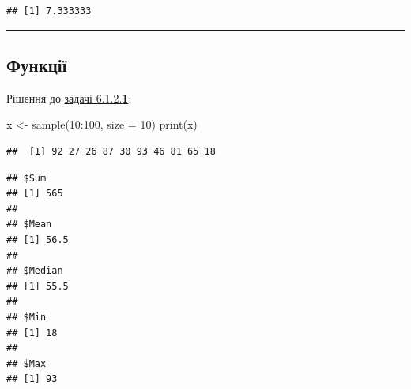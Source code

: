 \documentclass[
]{book}
\newenvironment{Shaded}{\begin{snugshade}}{\end{snugshade}}
\newcommand{\AttributeTok}[1]{\textcolor[rgb]{0.77,0.63,0.00}{#1}}
\newcommand{\ControlFlowTok}[1]{\textcolor[rgb]{0.13,0.29,0.53}{\textbf{#1}}}
\newcommand{\DecValTok}[1]{\textcolor[rgb]{0.00,0.00,0.81}{#1}}
\newcommand{\FunctionTok}[1]{\textcolor[rgb]{0.00,0.00,0.00}{#1}}
\newcommand{\NormalTok}[1]{#1}
\newcommand{\OtherTok}[1]{\textcolor[rgb]{0.56,0.35,0.01}{#1}}
\newcommand{\SpecialCharTok}[1]{\textcolor[rgb]{0.00,0.00,0.00}{#1}}
\begin{document}
\begin{verbatim}
## [1] 7.333333
\end{verbatim}

\begin{center}\rule{0.5\linewidth}{0.5pt}\end{center}

\hypertarget{chapter622}{%
\subsection{Функції}\label{chapter622}}

Рішення до \protect\hyperlink{task6121}{задачі 6.1.2.\textbf{1}}:

\begin{Shaded}
\begin{Highlighting}[]
\NormalTok{x }\OtherTok{\textless{}{-}} \FunctionTok{sample}\NormalTok{(}\DecValTok{10}\SpecialCharTok{:}\DecValTok{100}\NormalTok{, }\AttributeTok{size =} \DecValTok{10}\NormalTok{)}
\FunctionTok{print}\NormalTok{(x)}
\end{Highlighting}
\end{Shaded}

\begin{verbatim}
##  [1] 92 27 26 87 30 93 46 81 65 18
\end{verbatim}

\begin{Shaded}
\end{Shaded}

\begin{verbatim}
## $Sum
## [1] 565
## 
## $Mean
## [1] 56.5
## 
## $Median
## [1] 55.5
## 
## $Min
## [1] 18
## 
## $Max
## [1] 93
\end{verbatim}
\end{document}
